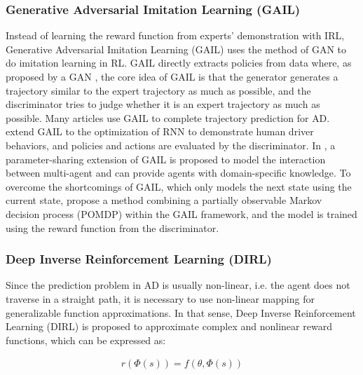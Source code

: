 \subsubsection{Generative Adversarial Imitation Learning (GAIL)}
\label{subsubsec:2_gail_mp}

Instead of learning the reward function from experts’ demonstration with IRL, Generative Adversarial Imitation Learning (GAIL) \cite{torabi2018generative} uses the method of GAN to do imitation learning in RL. GAIL directly extracts policies from data where, as proposed by a \ac{GAN} \cite{goodfellow2020generative}, the core idea of GAIL is that the generator generates a trajectory similar to the expert trajectory as much as possible, and the discriminator tries to judge whether it is an expert trajectory as much as possible. Many articles use GAIL to complete trajectory prediction for \ac{AD}. \cite{kuefler2017imitating} extend GAIL to the optimization of RNN to demonstrate human driver behaviors, and policies and actions are evaluated by the discriminator. In \cite{bhattacharyya2022modeling}, a parameter-sharing extension of GAIL is proposed to model the interaction between multi-agent and can provide agents with domain-specific knowledge. To overcome the shortcomings of GAIL, which only models the next state using the current state, \cite{choi2021trajgail} propose a method combining a partially observable Markov decision process (POMDP) within the GAIL framework, and the model is trained using the reward function from the discriminator.

\subsubsection{Deep Inverse Reinforcement Learning (DIRL)}
\label{subsubsec:2_dirl_mp}

Since the prediction problem in \ac{AD} is usually non-linear, i.e. the agent does not traverse in a straight path, it is necessary to use non-linear mapping for generalizable function approximations. In that sense, Deep Inverse Reinforcement Learning (DIRL) is proposed \cite{wulfmeier2015maximum} to approximate complex and nonlinear reward functions, which can be expressed as:

\begin{equation}
\begin{aligned}
r(\Phi(s))=f(\theta, \Phi(s))
\end{aligned}
\end{equation}

